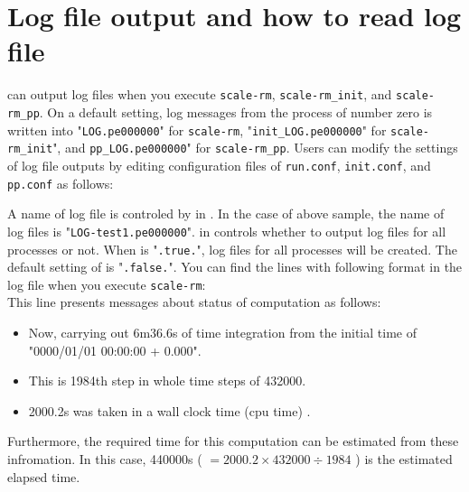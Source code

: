 \section{Log file output and how to read log file} \label{sec:log}


\scalerm can output log files when you execute \verb|scale-rm|, \verb|scale-rm_init|, and \verb|scale-rm_pp|. On a default setting, log messages from the process of number zero is written into "\verb|LOG.pe000000|" for \verb|scale-rm|, "\verb|init_LOG.pe000000|" for \verb|scale-rm_init|", and \verb|pp_LOG.pe000000|" for \verb|scale-rm_pp|. 
Users can modify the settings of log file outputs by editing configuration files of \texttt{run.conf}, \texttt{init.conf}, and \texttt{pp.conf} as follows:


A name of log file is controled by  in . In the case of above sample, the name of log files is "\verb|LOG-test1.pe000000|".  in  controls whether to output log files for all processes or not. When  is "\verb|.true.|", log files for all processes will be created. The default setting of  is "\verb|.false.|".
You can find the lines with following format in the log file when you execute \verb|scale-rm|:\\
This line presents messages about status of computation as follows:
\begin{itemize}
 \item Now, carrying out 6m36.6s of time integration from the initial time of "0000/01/01 00:00:00 + 0.000".
 \item This is 1984th step in whole time steps of 432000.
 \item 2000.2s was taken in a wall clock time (cpu time) .
\end{itemize}
Furthermore, the required time for this computation can be estimated from these infromation.
In this case, 440000s ( $= 2000.2 \times 432000 \div 1984$ ) is the estimated elapsed time.


%

